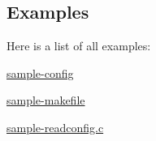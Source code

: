 \subsection{Examples}
Here is a list of all examples:\begin{CompactItemize}
\item 
\hyperlink{sample-config-example}{sample-config}
\item 
\hyperlink{sample-makefile-example}{sample-makefile}
\item 
\hyperlink{sample-readconfig_8c-example}{sample-readconfig.c}
\end{CompactItemize}
